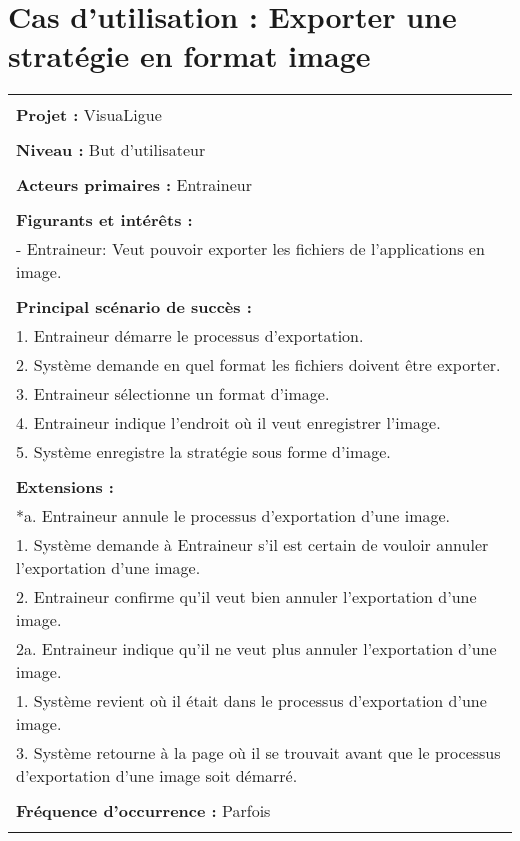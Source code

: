\section{Cas d'utilisation : Exporter une stratégie en format image}
\begin{longtable}{|p{16cm}|}
	\hline
	\\
	\textbf{Projet :} VisuaLigue\\
	\\
	\textbf{Niveau :} But d'utilisateur\\
	\\
	\textbf{Acteurs primaires :} Entraineur\\
	\\
	\textbf{Figurants et intérêts :} \\
	- Entraineur: Veut pouvoir exporter les fichiers de l'applications en image.\\
	\\
	\textbf{Principal scénario de succès :}\\
	1. Entraineur démarre le processus d'exportation.\\
	2. Système demande en quel format les fichiers doivent être exporter.\\
	3. Entraineur sélectionne un format d'image.\\
	4. Entraineur indique l'endroit où il veut enregistrer l'image.\\
	5. Système enregistre la stratégie sous forme d'image.\\
	\\
	\textbf{Extensions :}\\
	*a. Entraineur annule le processus d'exportation d'une image.\\
	\hspace{1cm}1. Système demande à Entraineur s'il est certain de vouloir annuler l'exportation d'une image.\\
	\hspace{1cm}2. Entraineur confirme qu'il veut bien annuler l'exportation d'une image.\\
	\hspace{2cm}2a. Entraineur indique qu'il ne veut plus annuler l'exportation d'une image.\\
	\hspace{3cm}1. Système revient où il était dans le processus d'exportation d'une image.\\
	\hspace{1cm}3. Système retourne à la page où il se trouvait avant que le processus d'exportation d'une image soit démarré.\\
	\\
	\textbf{Fréquence d'occurrence :} Parfois\\
	\\
	\hline
\end{longtable}